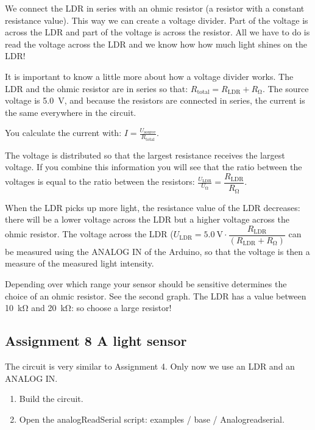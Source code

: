 \documentclass{arduino}
\begin{document}

We connect the LDR in series with an ohmic resistor (a resistor with a constant resistance value). This way we can create a voltage divider. Part of the voltage is across the LDR and part of the voltage is across the resistor. All we have to do is read the voltage across the LDR and we know how how much light shines on the LDR!

It is important to know a little more about how a voltage divider works. The LDR and the ohmic resistor are in series so that: $ R_\mathrm{total} = R_\mathrm{LDR} + R_{\si{\ohm}} $. The source voltage is \SI{5.0}{\volt}, and because the resistors are connected in series, the current is the same everywhere in the circuit.

You calculate the current with: $ I = \frac{U_\mathrm{source}}{R_\mathrm{total}} $. 

The voltage is distributed so that the largest resistance receives the largest voltage. If you combine this information you will see that the ratio between the voltages is equal to the ratio between the resistors: $ \frac{U_\mathrm{LDR}}{U _ {\si{\ohm}}} = \dfrac{R_\mathrm{LDR}}{R_{\si{\ohm}}} $.


When the LDR picks up more light, the resistance value of the LDR decreases: there will be a lower voltage across the LDR but a higher voltage across the ohmic resistor. The voltage across the LDR ($ U_\mathrm{LDR} = \SI{5.0}{\volt} \cdot \dfrac{R_\mathrm{LDR}}{(R_\mathrm{LDR} + R_{\si{\ohm}})} $ can be measured using the ANALOG IN of the Arduino, so that the voltage is then a measure of the measured light intensity.

Depending over which range your sensor should be sensitive determines the choice of an ohmic resistor. See the second graph. The LDR has a value between \SI{10}{\kilo\ohm} and \SI{20}{\kilo\ohm}: so choose a large resistor!

\newpage

\subsection{Assignment 8 A light sensor}


The circuit is very similar to Assignment 4. Only now we use an LDR and an ANALOG IN.

\begin{enumerate}[label={\alph*})]
\item Build the circuit.

\item Open the analogReadSerial  script: examples / base / Analogreadserial.
\end{enumerate}
\end{document}
